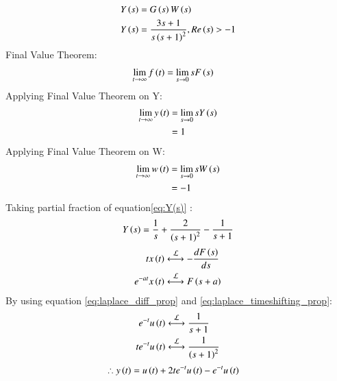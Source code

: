 \documentclass[journal,12pt,twocolumn]{IEEEtran}
\theoremstyle{remark}
\begin{document}
\begin{align}
    Y\left(s\right) &= G\left(s\right)W\left(s\right)\\
    Y\left(s\right) &=  \frac{3s+1}{s\left(s+1\right)^2} ,  Re\left(s\right)>-1 \label{eq:Y(s)}
\end{align}
Final Value Theorem:    
\begin{align}
    \lim_{t \to \infty} f\left(t\right)&= \lim_{s \to 0} sF\left(s\right)\label{eq:gate_ee_Q14.3}
\end{align}
Applying Final Value Theorem on Y:
\begin{align}
     \lim_{t \to \infty} y\left(t\right)&= \lim_{s \to 0} sY\left(s\right)\\
                            &= 1
\end{align}
Applying Final Value Theorem on W:
\begin{align}
     \lim_{t \to \infty} w\left(t\right)&= \lim_{s \to 0} sW\left(s\right)\\
                            &= -1
\end{align}
Taking partial fraction of equation\eqref{eq:Y(s)} :
\begin{align}
    Y\left(s\right) &= \frac{1}{s} + \frac{2}{\left(s+1\right)^2} - \frac{1}{s+1}\\
\end{align}
\begin{align}
    tx\brak{t} &\system{L} -\frac{dF\brak{s}}{ds} \label{eq:laplace_diff_prop} \\
    e^{-at}x\brak{t} &\system{L} F\brak{s+a}\label{eq:laplace_timeshifting_prop}
\end{align}
By using equation \eqref{eq:laplace_diff_prop} and \eqref{eq:laplace_timeshifting_prop}:
\begin{align}
    e^{-t}u\brak{t} &\system{L} \frac{1}{s+1} \\
    t e^{-t}u\brak{t} &\system{L} \frac{1}{\brak{s+1}^2}
\end{align}
\begin{align}
    \therefore y\left(t\right) &= u\left(t\right)+ 2t e^{-t}u\left(t\right) - e^{-t}u\left(t\right)
\end{align}
\end{document}
